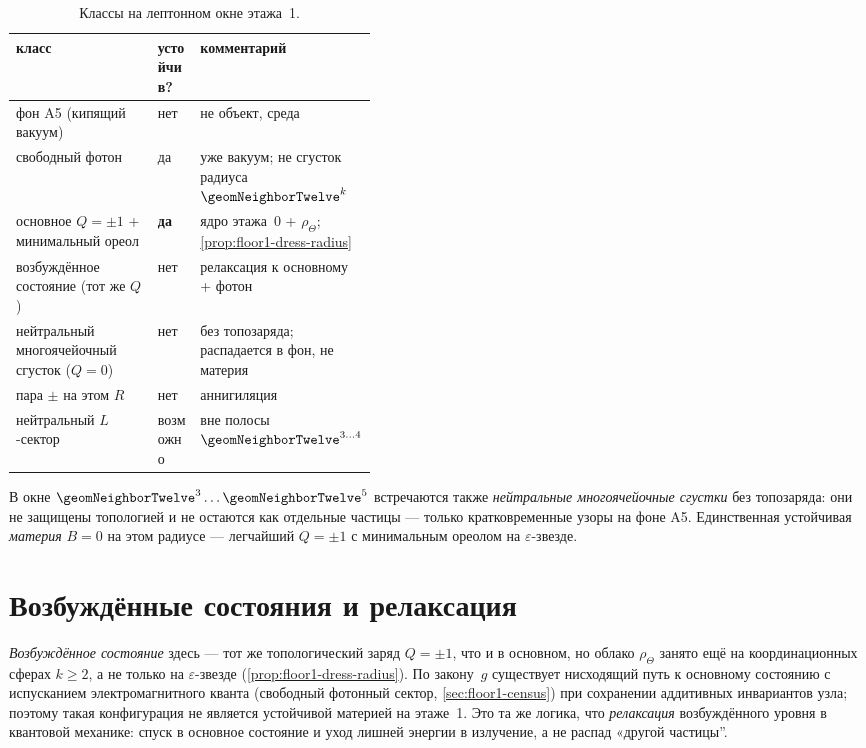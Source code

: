 \begin{table}[htbp]
  \centering
  \caption{Классы на лептонном окне этажа~1.}
  \label{tab:floor1-census}
  \footnotesize
  \setlength{\tabcolsep}{4pt}
  \begin{tabular}{@{}llp{0.42\linewidth}@{}}
    \toprule
    класс & устойчив? & комментарий \\
    \midrule
    фон A5 (кипящий вакуум) & нет & не объект, среда \\
    свободный фотон & да & уже вакуум; не сгусток радиуса $\geomNeighborTwelve^{k}$ \\
    основное $Q=\pm1$ + минимальный ореол & \textbf{да} & ядро этажа~0 + $\rho_\Theta$; \cref{prop:floor1-dress-radius} \\
    возбуждённое состояние (тот же $Q$) & нет & релаксация к основному + фотон \\
    нейтральный многоячейочный сгусток ($Q=0$) & нет & без топозаряда; распадается в фон, не материя \\
    пара $\pm$ на этом $R$ & нет & аннигиляция \\
    нейтральный $L$-сектор & возможно & вне полосы $\geomNeighborTwelve^{3\ldots 4}$ \\
    \bottomrule
  \end{tabular}
\end{table}

В окне $\geomNeighborTwelve^{3}\ldots \geomNeighborTwelve^{5}$ встречаются также
\emph{нейтральные многоячейочные сгустки} без топозаряда: они не защищены топологией
и не остаются как отдельные частицы --- только кратковременные узоры на фоне A5.
Единственная устойчивая \emph{материя} $B=0$ на этом радиусе --- легчайший $Q=\pm1$
с минимальным ореолом на $\varepsilon$-звезде.

\section{Возбуждённые состояния и релаксация}
\label{sec:floor1-excited-states}

\emph{Возбуждённое состояние} здесь --- тот же топологический заряд $Q=\pm1$, что и в основном,
но облако $\rho_\Theta$ занято ещё на координационных сферах $k\ge 2$, а не только на $\varepsilon$-звезде
(\cref{prop:floor1-dress-radius}).
По закону~$g$ существует нисходящий путь к основному состоянию с испусканием
электромагнитного кванта (свободный фотонный сектор, \cref{sec:floor1-census})
при сохранении аддитивных инвариантов узла;
поэтому такая конфигурация не является устойчивой материей на этаже~1.
Это та же логика, что \emph{релаксация} возбуждённого уровня в квантовой механике:
спуск в основное состояние и уход лишней энергии в излучение, а не распад «другой частицы''.

